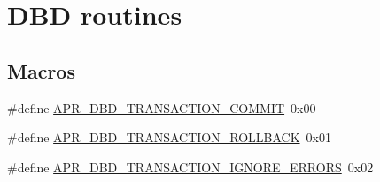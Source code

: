 \hypertarget{group___a_p_r___util___d_b_d}{\section{D\-B\-D routines}
\label{group___a_p_r___util___d_b_d}
}
\subsection*{Macros}
\begin{DoxyCompactItemize}
\item 
\#define \hyperlink{group___a_p_r___util___d_b_d_gaff6a26fb3b384bcb3a9172676c53590b}{A\-P\-R\-\_\-\-D\-B\-D\-\_\-\-T\-R\-A\-N\-S\-A\-C\-T\-I\-O\-N\-\_\-\-C\-O\-M\-M\-I\-T}~0x00
\item 
\#define \hyperlink{group___a_p_r___util___d_b_d_ga60a8749e5172b692fd2e356b48ec922b}{A\-P\-R\-\_\-\-D\-B\-D\-\_\-\-T\-R\-A\-N\-S\-A\-C\-T\-I\-O\-N\-\_\-\-R\-O\-L\-L\-B\-A\-C\-K}~0x01
\item 
\#define \hyperlink{group___a_p_r___util___d_b_d_gad9dc523b0a3b8dea5b8c9b7b0c281ea2}{A\-P\-R\-\_\-\-D\-B\-D\-\_\-\-T\-R\-A\-N\-S\-A\-C\-T\-I\-O\-N\-\_\-\-I\-G\-N\-O\-R\-E\-\_\-\-E\-R\-R\-O\-R\-S}~0x02
\end{DoxyCompactItemize}
